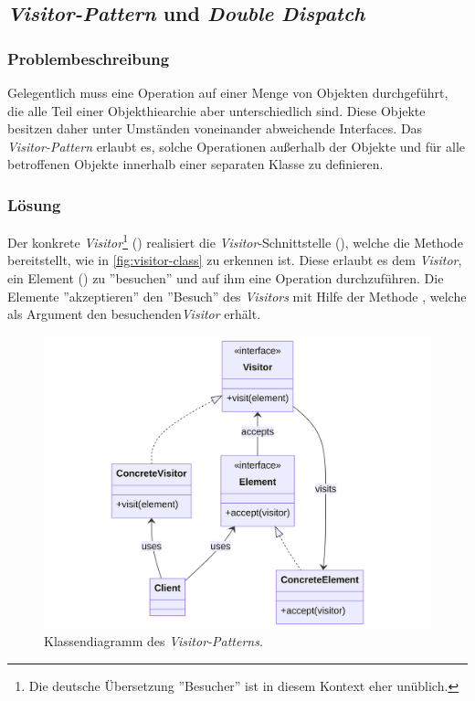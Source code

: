 \subsection{\emph{Visitor-Pattern} und \emph{Double Dispatch}}


\subsubsection*{Problembeschreibung}

Gelegentlich muss eine Operation auf einer Menge von Objekten durchgeführt, die alle Teil einer Objekthiearchie aber unterschiedlich sind. Diese Objekte besitzen daher unter Umständen voneinander abweichende Interfaces. Das \emph{Visitor-Pattern} erlaubt es, solche Operationen außerhalb der Objekte und für alle betroffenen Objekte innerhalb einer separaten Klasse zu definieren. \cite{gamma_design_1995}

\subsubsection*{Lösung}

Der konkrete \emph{Visitor}\footnote{Die deutsche Übersetzung ''Besucher'' ist in diesem Kontext eher unüblich.} () realisiert die \emph{Visitor}-Schnittstelle (), welche die Methode  bereitstellt, wie in \autoref{fig:visitor-class} zu erkennen ist. Diese erlaubt es dem \emph{Visitor}, ein Element () zu ''besuchen'' und auf ihm eine Operation durchzuführen. Die Elemente ''akzeptieren'' den ''Besuch'' des \emph{Visitors} mit Hilfe der Methode , welche als Argument den besuchenden\emph{Visitor} erhält.

\begin{figure}[!ht]
	\centering
	\includegraphics[width=0.75\linewidth]{images/patterns/visitor-class.png}
	\caption{Klassendiagramm des \emph{Visitor-Patterns}. \cite{skobeleva_visitor_2023}}
	\label{fig:visitor-class}
\end{figure}

